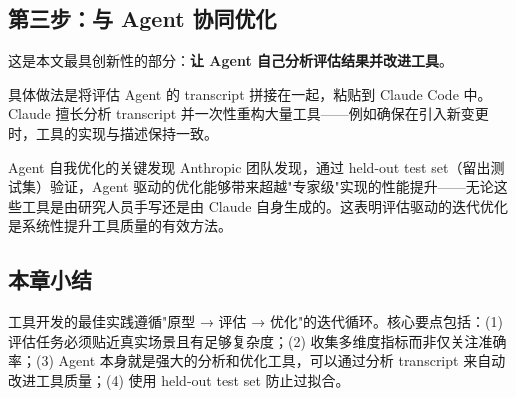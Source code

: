 \subsection{第三步：与 Agent 协同优化}

这是本文最具创新性的部分：\textbf{让 Agent 自己分析评估结果并改进工具}。

具体做法是将评估 Agent 的 transcript 拼接在一起，粘贴到 Claude Code 中。Claude 擅长分析 transcript 并一次性重构大量工具——例如确保在引入新变更时，工具的实现与描述保持一致。

\begin{importantbox}{Agent 自我优化的关键发现}
Anthropic 团队发现，通过 held-out test set（留出测试集）验证，Agent 驱动的优化能够带来超越"专家级"实现的性能提升——无论这些工具是由研究人员手写还是由 Claude 自身生成的。这表明评估驱动的迭代优化是系统性提升工具质量的有效方法。
\end{importantbox}

\subsection{本章小结}

工具开发的最佳实践遵循"原型 → 评估 → 优化"的迭代循环。核心要点包括：(1) 评估任务必须贴近真实场景且有足够复杂度；(2) 收集多维度指标而非仅关注准确率；(3) Agent 本身就是强大的分析和优化工具，可以通过分析 transcript 来自动改进工具质量；(4) 使用 held-out test set 防止过拟合。


